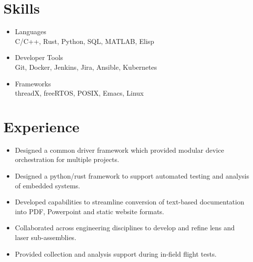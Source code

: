 \documentclass[a4paper,ragged2e,withhyper]{altacv}
\begin{document}
{\divider

\divider



\section{Skills}
\label{sec:orgdcbbe64}
\begin{itemize}
\item Languages\\
C/C++, Rust, Python, SQL, MATLAB, Elisp\\
\item Developer Tools\\
Git, Docker, Jenkins, Jira, Ansible, Kubernetes\\
\item Frameworks\\
threadX, freeRTOS, POSIX, Emacs, Linux\\
\end{itemize}

}
\section{Experience}
\label{sec:org71d5b53}


\begin{itemize}
\item Designed a common driver framework which provided modular device orchestration for multiple projects.\\
\item Designed a python/rust framework to support automated testing and analysis of embedded systems.\\
\item Developed capabilities to streamline conversion of text-based documentation into PDF, Powerpoint and static website formats.\\
\item Collaborated across engineering disciplines to develop and refine lens and laser sub-assemblies.\\
\item Provided collection and analysis support during in-field flight tests.\\
\end{itemize}
\end{document}
